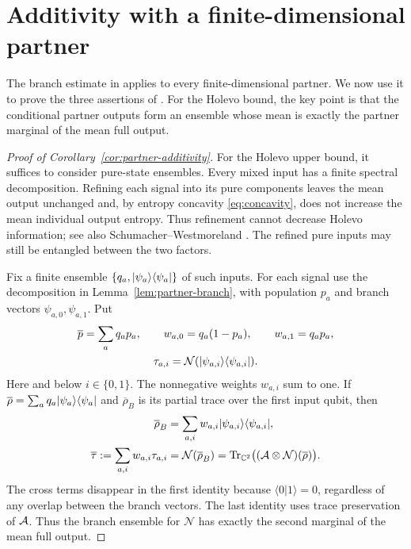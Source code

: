 \section{Additivity with a finite-dimensional partner}\label{sec:partners}

The branch estimate in  applies to every
finite-dimensional partner. We now use it to prove the three assertions
of . For the Holevo bound, the key point is
that the conditional partner outputs form an ensemble whose mean is
exactly the partner marginal of the mean full output.

\begin{proof}[Proof of Corollary~\ref{cor:partner-additivity}]
For the Holevo upper bound, it suffices to consider pure-state ensembles.
Every mixed input has a finite spectral decomposition. Refining each
signal into its pure components leaves the mean output unchanged and,
by entropy concavity \eqref{eq:concavity}, does not increase the mean
individual output entropy. Thus refinement cannot decrease Holevo
information; see also Schumacher--Westmoreland
\cite{SchumacherWestmoreland1997}.
The refined pure inputs may still be entangled between the two factors.

Fix a finite ensemble $\{q_a,\lvert \psi_a\rangle\langle \psi_a\rvert\}$ of such inputs.
For each signal use
the decomposition in Lemma~\ref{lem:partner-branch}, with population $p_a$
and branch vectors $\psi_{a,0},\psi_{a,1}$. Put
\[
 \begin{gathered}
 \overline p=\sum_aq_ap_a,\qquad
 w_{a,0}=q_a(1-p_a),\qquad w_{a,1}=q_ap_a,\\
 \tau_{a,i}=\mathcal N(\lvert \psi_{a,i}\rangle\langle \psi_{a,i}\rvert).
 \end{gathered}
\]
Here and below $i\in\{0,1\}$.
The nonnegative weights $w_{a,i}$ sum to one. If
$\overline\rho=\sum_aq_a\lvert \psi_a\rangle\langle \psi_a\rvert$ and $\overline\rho_B$ is its
partial trace over the first input qubit, then
\begin{equation}\label{eq:partner-marginal}
 \begin{aligned}
 \overline\rho_B&=\sum_{a,i}w_{a,i}\lvert \psi_{a,i}\rangle\langle \psi_{a,i}\rvert,\\
 \overline\tau:=\sum_{a,i}w_{a,i}\tau_{a,i}
 &=\mathcal N(\overline\rho_B)
 =\operatorname{Tr}_{\mathbb C^2}\bigl((\mathcal A\otimes\mathcal N)(\overline\rho)\bigr).
 \end{aligned}
\end{equation}
The cross terms disappear in the first identity because
$\langle0|1\rangle=0$, regardless of any overlap between the branch
vectors. The last identity uses trace preservation of $\mathcal A$. Thus the
branch ensemble for $\mathcal N$ has exactly the second marginal of
the mean full output.


\end{proof}
